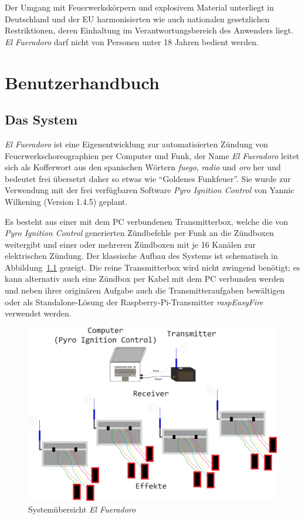 \documentclass[paper=a4, parskip, numbers=noenddot, toc=listof, headsepline]{scrbook}
\newcommand{\pic}{\emph{Pyro Ignition Control}}
\newcommand{\anlage}{\emph{El Fueradoro}}
\begin{document}
	Der Umgang mit Feuerwerkskörpern und explosivem Material unterliegt in Deutschland und der EU harmonisierten wie auch nationalen gesetzlichen Restriktionen, deren Einhaltung im Verantwortungsbereich des Anwenders liegt. {\anlage} darf nicht von Personen unter 18 Jahren bedient werden.

	\tableofcontents
\part{Benutzerhandbuch}

	\chapter{Das System}

		\anlage{} ist eine Eigenentwicklung zur automatisierten Zündung von Feuer\-werks\-choreo\-gra\-phien per Computer und Funk, der Name {\anlage} leitet sich als Kofferwort aus den spanischen Wörtern \emph{fuego}, \emph{radio} und \emph{oro} her und bedeutet frei übersetzt daher so etwas wie \enquote{Goldenes Funkfeuer}. Sie wurde zur Verwendung mit der frei verfügbaren Software {\pic} von Yannic Wilkening (Version 1.4.5) geplant.

		Es besteht aus einer mit dem PC verbundenen Transmitterbox, welche die von {\pic} generierten Zündbefehle per Funk an die Zündboxen weitergibt und einer oder mehreren Zündboxen mit je 16 Kanälen zur elektrischen Zündung. Der klassische Aufbau des Systems ist schematisch in Abbildung~\ref{fig:system} gezeigt. Die reine Transmitterbox wird nicht zwingend benötigt; es kann alternativ auch eine Zündbox per Kabel mit dem PC verbunden werden und neben ihrer originären Aufgabe auch die Transmitteraufgaben bewältigen oder als Standalone-Lösung der Raspberry-Pi-Transmitter \emph{raspEasyFire} verwendet werden.

		\begin{figure}
			\centering
			\includegraphics[width=.8\textwidth]{Bilder/system}
			\caption{Systemübersicht \anlage}
			\label{fig:system}
		\end{figure}
\end{document}
